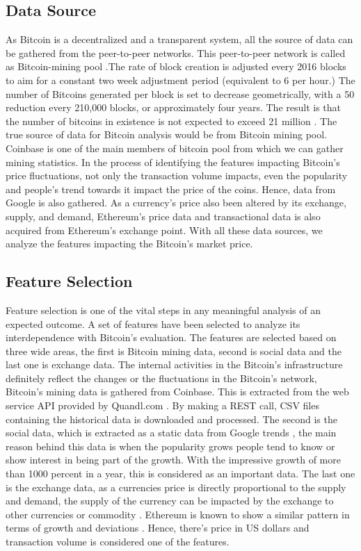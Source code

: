 \documentclass[sigconf]{acmart}
\begin{document}
 
 \subsection{Data Source}
 As Bitcoin is a decentralized and a transparent system, all the source of data can be gathered from the peer-to-peer networks. This peer-to-peer network is called as Bitcoin-mining pool \cite{1:online}.The rate of block creation is adjusted every 2016 blocks to aim for a constant two week adjustment period (equivalent to 6 per hour.) The number of Bitcoins generated per block is set to decrease geometrically, with a 50 reduction every 210,000 blocks, or approximately four years. The result is that the number of bitcoins in existence is not expected to exceed 21 million \cite{2:online}.
The true source of data for Bitcoin analysis would be from Bitcoin mining pool. Coinbase is one of the main members of bitcoin pool from which we can gather mining statistics. In the process of identifying the features impacting Bitcoin's price fluctuations, not only the transaction volume impacts, even the popularity and people's trend towards it impact the price of the coins. Hence, data from Google is also gathered. As a currency's price also been altered by its exchange, supply, and demand, Ethereum's price data and transactional data is also acquired from Ethereum's exchange point.
With all these data sources, we analyze the features impacting the Bitcoin's market price. 
 
 
 \subsection{Feature Selection}
 Feature selection is one of the vital steps in any meaningful analysis of an expected outcome. A set of features have been selected to analyze its interdependence with Bitcoin's evaluation. The features are selected based on three wide areas, the first is Bitcoin mining data, second is social data and the last one is exchange data.
 The internal activities in the Bitcoin's infrastructure definitely reflect the changes or the fluctuations in the Bitcoin's network, Bitcoin's mining data is gathered from Coinbase. This is extracted from the web service API provided by Quandl.com \cite{3:online}. By making a REST call, CSV files containing the historical data is downloaded and processed.
 The second is the social data, which is extracted as a static data from Google trends \cite{google:online}, the main reason behind this data is when the popularity grows people tend to know or show interest in being part of the growth. With the impressive growth of more than 1000 percent in a year, this is considered as an important data.
 The last one is the exchange data, as a currencies price is directly proportional to the supply and demand, the supply of the currency can be impacted by the exchange to other currencies or commodity \cite{4:online}. Ethereum is known to show a similar pattern in terms of growth and deviations \cite{Ethereum:online}. Hence, there's price in US dollars and transaction volume is considered one of the features.
\end{document}
